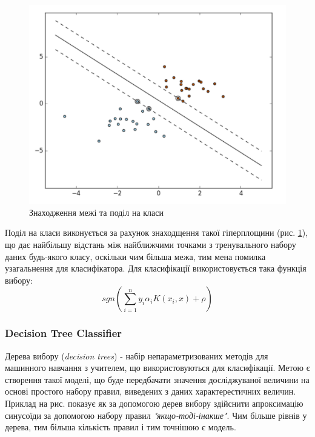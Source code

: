 \begin{figure}[h!]
  \includegraphics[width=\linewidth]{figures/svm.png}
  \caption{Знаходження межі та поділ на класи}
  \label{fig:svm}
\end{figure}

Поділ на класи виконується за рахунок знаходщення такої гіперплощини (рис. \ref{fig:svm}), що дає найбільшу відстань між найближчими точками з тренувального набору даних будь-якого класу, оскільки чим більша межа, тим мена помилка узагальнення для класифікатора. Для класифікації використовується така функція вибору:
\begin{equation}
    \label{eq:svc}
    sgn(\sum_{i=1}^n y_{i}\alpha_{i}K(x_{i}, x)+\rho)
\end{equation}

\subsubsection{Decision Tree Classifier}
Дерева вибору (\textit{decision trees}) - набір непараметризованих методів для машинного навчання з учителем, що використовуються для класифікації. Метою є створення такої моделі, що буде передбачати значення досліджуваної величини на основі простого набору правил, виведених з даних характерестичних величин. Приклад на рис. показує як за допомогою дерев вибору здійснити апроксимацію синусоїди за допомогою набору правил \textit{"якщо-тоді-інакше"}. Чим більше рівнів у дерева, тим більша кількість правил і тим точнішою є модель.

